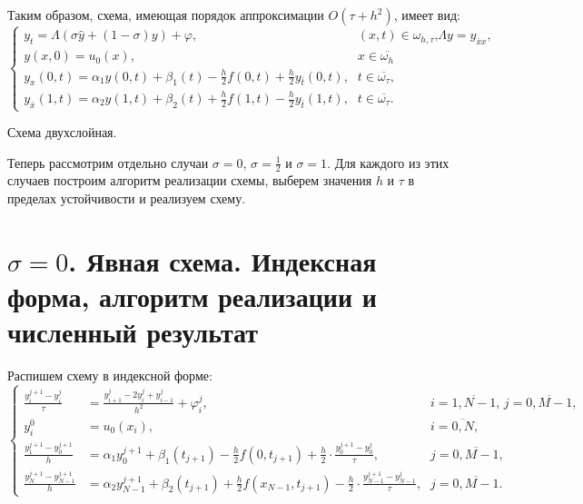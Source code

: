 Таким образом, схема, имеющая порядок аппроксимации $O(\tau + h^{2})$, имеет вид:
\begin{equation}
\left\{
\begin{array}{ll}
y_{t} = \Lambda (\sigma \hat{y} + (1-\sigma)y) + \varphi \text{,} & (x,t)\in \omega_{h,\tau} \text{,} \Lambda y = y_{\bar{x}x} \text{,} \\
y(x,0) = u_{0}(x) \text{,} & x \in \overline{\omega_{h}} \\
y_{x}(0,t) = \alpha_{1}y(0,t)+\beta_{1}(t)-\frac{h}{2}f(0,t)+\frac{h}{2}y_{\bar{t}}(0,t)\text{,} & t \in \overline{\omega_{\tau}} \text{,} \\
y_{\bar{x}}(1,t) = \alpha_{2}y(1,t)+\beta_{2}(t)+\frac{h}{2}f(1,t)-\frac{h}{2}y_{\bar{t}}(1,t)\text{,} & t \in \overline{\omega_{\tau}} \text{.}
\end{array}
\right.
\end{equation} \par
Схема двухслойная. \par

Теперь рассмотрим отдельно случаи $\sigma=0$, $\sigma=\frac{1}{2}$ и $\sigma=1$. Для каждого из этих случаев построим алгоритм реализации схемы, выберем значения $h$ и $\tau$ в пределах устойчивости и реализуем схему.

\section{$\sigma=0$. Явная схема. Индексная форма, алгоритм реализации и численный результат}
Распишем схему в индексной форме:
\begin{equation}
\left\{
\begin{array}{lll}
\frac{y_{i}^{j+1}-y_{i}^{j}}{\tau} & = \frac{y_{i+1}^{j}-2y_{i}^{j}+y_{i-1}^{j}}{h^{2}} + \varphi_{i}^{j}\text{,} & i=\overline{1,N-1}\text{, } j=\overline{0,M-1}\text{,}\\
y_{i}^{0} & = u_{0}(x_{i})\text{,} & i=\overline{0,N}\text{,} \\
\frac{y_{1}^{j+1}-y_{0}^{j+1}}{h} & = \alpha_{1}y_{0}^{j+1} + \beta_{1}(t_{j+1}) - \frac{h}{2}f(0,t_{j+1}) + \frac{h}{2}\cdot\frac{y_{0}^{j+1}-y_{0}^{j}}{\tau}\text{,} & j=\overline{0,M-1}\text{,}\\
\frac{y_{N}^{j+1}-y_{N-1}^{j+1}}{h} & = \alpha_{2}y_{N-1}^{j+1} + \beta_{2}(t_{j+1}) + \frac{h}{2}f(x_{N-1},t_{j+1}) - \frac{h}{2}\cdot\frac{y_{N-1}^{j+1}-y_{N-1}^{j}}{\tau}\text{,} & j=\overline{0,M-1}\text{.}
\end{array}
\right.
\end{equation} \par


